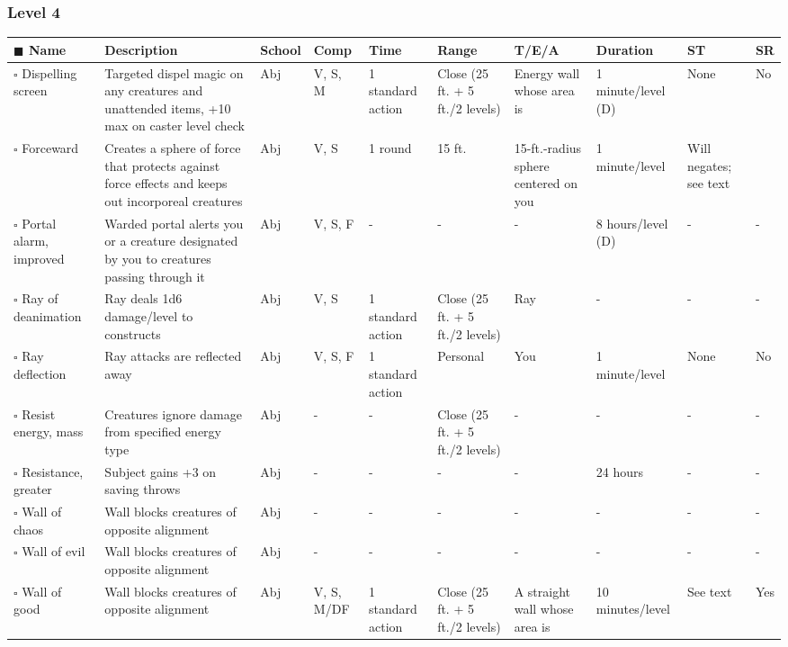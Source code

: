 \documentclass[12pt, a4paper]{article}
\begin{document}
\begin{center}
  \subsubsection*{Level 4}
  \begin{longtable}[H]{ p{8em} p{15em} p{2em} p{5em} p{6em} p{6em} p{10em} p{6em} p{5em} p{2em} }
    \(\blacksquare\) \textbf{Name} & \textbf{Description} & \textbf{School} & \textbf{Comp} & \textbf{Time} & \textbf{Range} & \textbf{T/E/A} & \textbf{Duration} & \textbf{ST} & \textbf{SR}\\
    \endhead
    \(\square\) Dispelling screen & Targeted dispel magic on any creatures and unattended items, +10 max on caster level check & Abj & V, S, M & 1 standard action & Close (25 ft. + 5 ft./2 levels) & Energy wall whose area is  & 1 minute/level (D) & None & No\\
    \(\square\) Forceward & Creates a sphere of force that protects against force effects and keeps out incorporeal creatures & Abj & V, S & 1 round & 15 ft. & 15-ft.-radius sphere centered on you & 1 minute/level & Will negates; see text & \\
    \(\square\) Portal alarm, improved & Warded portal alerts you or a creature designated by you to creatures passing through it & Abj & V, S, F & - & - & - & 8 hours/level (D) & - & -\\
    \(\square\) Ray of deanimation & Ray deals 1d6 damage/level to constructs & Abj & V, S & 1 standard action & Close (25 ft. + 5 ft./2 levels) & Ray & - & - & -\\
    \(\square\) Ray deflection & Ray attacks are reﬂected away & Abj & V, S, F & 1 standard action & Personal & You & 1 minute/level & None & No\\
    \(\square\) Resist energy, mass & Creatures ignore damage from speciﬁed energy type & Abj & - & - & Close (25 ft. + 5 ft./2 levels) & - & - & - & -\\
    \(\square\) Resistance, greater & Subject gains +3 on saving throws & Abj & - & - & - & - & 24 hours & - & -\\
    \(\square\) Wall of chaos & Wall blocks creatures of opposite alignment & Abj & - & - & - & - & - & - & -\\
    \(\square\) Wall of evil & Wall blocks creatures of opposite alignment & Abj & - & - & - & - & - & - & -\\
    \(\square\) Wall of good & Wall blocks creatures of opposite alignment & Abj & V, S, M/DF & 1 standard action & Close (25 ft. + 5 ft./2 levels) & A straight wall whose area is  & 10 minutes/level & See text & Yes\\

\end{longtable}
\end{center}
\end{document}

